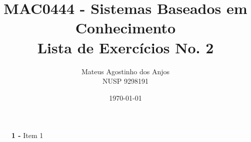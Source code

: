 \documentclass[12pt]{article}
\title{MAC0444 - Sistemas Baseados em Conhecimento \\
Lista de Exercícios No. 2
}
\author{Mateus Agostinho dos Anjos\\NUSP 9298191}
\date{\today}
\begin{document}
	\maketitle
	\begin{itemize}
		\item[\textbf{1 -}]
			Item 1
	\end{itemize}
\end{document}
